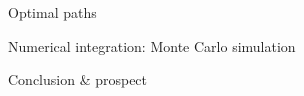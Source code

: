 \documentclass[aspectratio=169]{beamer}
\begin{document}
\begin{frame}{Optimal paths}

\end{frame}


\begin{frame}{Numerical integration: Monte Carlo simulation}

\end{frame}


\begin{frame}{Conclusion \& prospect}

\end{frame}

\end{document}
